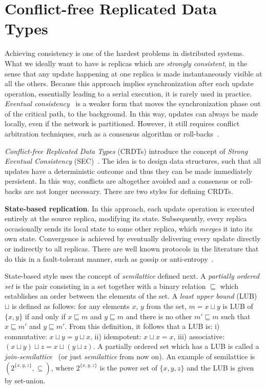\section{Conflict-free Replicated Data Types}
\label{sec:crdts}

Achieving consistency is one of the hardest problems in distributed
systems. What we ideally want to have is replicas which are \textit{strongly
consistent}, in the sense that any update happening at one replica is made
instantaneously visible at all the others. Because this approach implies
synchronization after each update operation, essentially leading to a serial
execution, it is rarely used in practice. \textit{Eventual
consistency}~\cite{DBLP:journals/queue/Vogels08a,Saito:2005:OR:1057977.1057980}
is a weaker form that moves the synchronization phase out of the critical path,
to the background. In this way, updates can always be made locally, even if the
network is partitioned. However, it still requires conflict arbitration
techniques, such as a consensus algorithm or
roll-backs~\cite{Terry:1995:MUC:224056.224070}.

\textit{Conflict-free Replicated Data Types} (CRDTs) introduce the concept of
\textit{Strong Eventual Consistency}
(SEC)~\cite{Shapiro:2011:CRD:2050613.2050642}. The idea is to design data
structures, such that all updates have a deterministic outcome and thus they can
be made immediately persistent. In this way, conflicts are altogether avoided
and a consensus or roll-backs are not longer necessary. There are two
styles for defining CRDTs.

\textbf{State-based replication}. In this approach, each update operation is
executed entirely at the source replica, modifying its state. Subsequently,
every replica occasionally sends its local state to some other replica, which
\textit{merges} it into its own state. Convergence is achieved by eventually
delivering every update directly or indirectly to all replicas. There are well
known protocols in the literature that do this in a fault-tolerant manner, such
as gossip or anti-entropy~\cite{Demers:1987:EAR:41840.41841,
Petersen:1997:FUP:268998.266711}.

State-based style uses the concept of \textit{semilattice} defined next. A
\textit{partially ordered set} is the pair consisting in a set together with a
binary relation $\sqsubseteq$ which establishes an order between the elements of
the set. A \textit{least upper bound} (LUB) $\sqcup$ is defined as follows: for
any elements $x$, $y$ from the set, $m = x \sqcup y$ is LUB of $\{x, y\}$ if and
only if $x \sqsubseteq m$ and $y \sqsubseteq m$ and there is no other $m'
\sqsubseteq m$ such that $x \sqsubseteq m'$ and $y \sqsubseteq m'$. From this
definition, it follows that a LUB is: i) commutative: $x \sqcup y = y \sqcup x$,
ii) idempotent: $x \sqcup x = x$, iii) associative: $(x \sqcup y) \sqcup z = x
\sqcup (y \sqcup z)$. A partially ordered set which has a LUB is called a
\textit{join-semilattice}~\cite{semilattice} (or just \textit{semilattice} from
now on). An example of semilattice is $(2^{\{x, y, z\}}, \subseteq)$, where
$2^{\{x, y, z\}}$ is the power set of $\{x, y, z\}$ and the LUB is given by
set-union.

